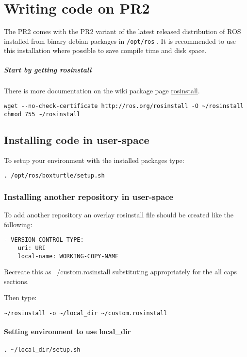 \chapter{Writing code on PR2}
The PR2 comes with the PR2 variant of the latest released distribution
of ROS installed from binary debian packages in \texttt{/opt/ros} .  It is
recommended to use this installation where possible to save compile time and
disk space.

\paragraph{Start by getting rosinstall}
There is more documentation on the wiki package page
\href{http://www.ros.org/wiki/rosinstall}{rosinstall}.

\begin{verbatim}
wget --no-check-certificate http://ros.org/rosinstall -O ~/rosinstall
chmod 755 ~/rosinstall
\end{verbatim}

\section{Installing code in user-space}
To setup your environment with the installed packages type:
\begin{verbatim}
. /opt/ros/boxturtle/setup.sh
\end{verbatim}
\subsection{Installing another repository in user-space}
To add another repository an overlay rosinstall file should be created
like the following:
\begin{verbatim}
- VERSION-CONTROL-TYPE:
    uri: URI
    local-name: WORKING-COPY-NAME
\end{verbatim}
Recreate this as ~/custom.rosinstall substituting appropriately for the all caps sections. 

Then type:
\begin{verbatim}
~/rosinstall -o ~/local_dir ~/custom.rosinstall
\end{verbatim}
\subsubsection{Setting environment to use local\_dir}
\begin{verbatim}
. ~/local_dir/setup.sh
\end{verbatim}

